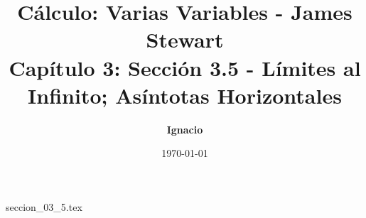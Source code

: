 \documentclass[11pt,spanish,oneside]{report}
\title{\textbf{Cálculo: Varias Variables - James Stewart} \\ \Large Capítulo 3: Sección 3.5 - Límites al Infinito; Asíntotas Horizontales}
\author{\textbf{Ignacio}}
\date{\today}
\begin{document}
\maketitle

{seccion_03_5.tex}
\end{document}

